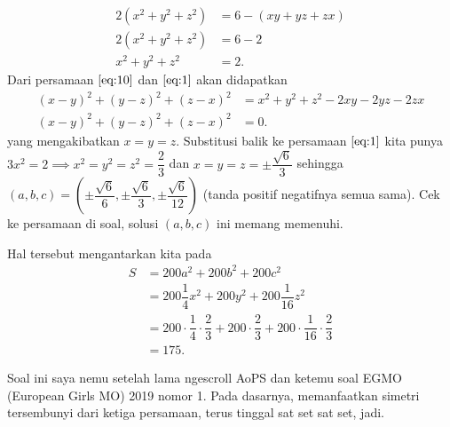 \begin{jawaban}
\begin{align}
    2(x^2+y^2+z^2) &= 6 - (xy+yz+zx) \nonumber\\
    2(x^2+y^2+z^2) &= 6 - 2 \nonumber\\
    x^2+y^2+z^2 &= 2. \label{eq:10}
\end{align}
Dari persamaan $\eqref{eq:10}$ dan $\eqref{eq:1}$ akan didapatkan
\begin{align}
    (x-y)^2+(y-z)^2+(z-x)^2 &= x^2 + y^2 + z^2 - 2xy -2yz -2zx \nonumber\\
    (x-y)^2+(y-z)^2+(z-x)^2 &= 0. \label{eq:11}
\end{align}
yang mengakibatkan $x=y=z$. Substitusi balik ke persamaan $\eqref{eq:1}$ kita punya
$3x^2=2 \implies x^2 = y^2 = z^2 = \dfrac{2}{3}$ dan $x=y=z=\pm\dfrac{\sqrt{6}}{3}$ sehingga\\ $(a,b,c)=\left(\pm\dfrac{\sqrt{6}}{6},\pm\dfrac{\sqrt{6}}{3},\pm\dfrac{\sqrt{6}}{12}\right)$ (tanda positif negatifnya semua sama). Cek ke persamaan di soal, solusi $(a,b,c)$ ini memang memenuhi.

Hal tersebut mengantarkan kita pada 
\begin{align*}
    S &= 200a^2+200b^2+200c^2\\
     &= 200\dfrac{1}{4}x^2+200y^2+200\dfrac{1}{16}z^2\\
      &= 200\cdot \dfrac{1}{4} \cdot \dfrac{2}{3} + 200\cdot\dfrac{2}{3} + 200\cdot\dfrac{1}{16} \cdot \dfrac{2}{3}\\
      &= \boxed{175}.
\end{align*}

\end{jawaban}
\begin{remark}
Soal ini saya nemu setelah lama ngescroll AoPS dan ketemu soal EGMO (European Girls MO) 2019 nomor 1. Pada dasarnya, memanfaatkan simetri tersembunyi dari ketiga persamaan, terus tinggal sat set sat set, jadi.
\end{remark}
